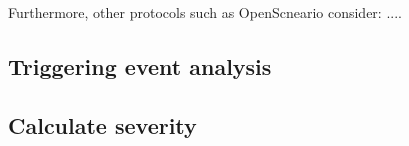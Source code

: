 Furthermore, other protocols such as OpenScneario consider: ....


\subsection{Triggering event analysis}



\subsection{Calculate severity}
\label{sec:severity}

